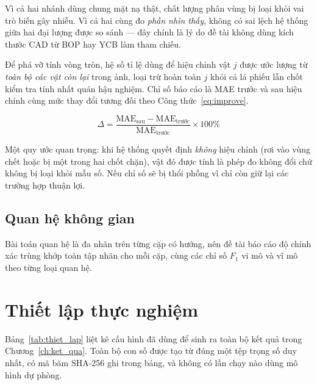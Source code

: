 Vì cả hai nhánh dùng chung mặt nạ thật, chất lượng phân vùng bị loại khỏi vai trò biến gây
nhiễu. Vì cả hai cùng đo \emph{phần nhìn thấy}, không có sai lệch hệ thống giữa hai đại lượng
được so sánh --- đây chính là lý do đề tài không dùng kích thước CAD từ BOP \cite{hodan2018bop}
hay YCB \cite{calli2015ycb} làm tham chiếu.

Để phá vỡ tính vòng tròn, hệ số tỉ lệ dùng để hiệu chỉnh vật $j$ được ước lượng từ \emph{toàn bộ
các vật còn lại} trong ảnh, loại trừ hoàn toàn $j$ khỏi cả lá phiếu lẫn chốt kiểm tra tính nhất
quán hậu nghiệm. Chỉ số báo cáo là MAE trước và sau hiệu chỉnh cùng mức thay đổi tương đối theo
Công thức~\eqref{eq:improve}.

\begin{equation}
\label{eq:improve}
\Delta = \frac{\mathrm{MAE}_{\text{sau}} - \mathrm{MAE}_{\text{trước}}}{\mathrm{MAE}_{\text{trước}}} \times 100\%
\end{equation}

Một quy ước quan trọng: khi hệ thống quyết định \emph{không} hiệu chỉnh (rơi vào vùng chết hoặc
bị một trong hai chốt chặn), vật đó được tính là phép đo không đổi chứ không bị loại khỏi mẫu số.
Nếu chỉ số sẽ bị thổi phồng vì chỉ còn giữ lại các trường hợp thuận lợi.

\subsection{Quan hệ không gian}

Bài toán quan hệ là đa nhãn trên từng cặp có hướng, nên đề tài báo cáo độ chính xác trùng khớp
toàn tập nhãn cho mỗi cặp, cùng các chỉ số $F_1$ vi mô và vĩ mô theo từng loại quan hệ.

\section{Thiết lập thực nghiệm}

Bảng~\ref{tab:thiet_lap} liệt kê cấu hình đã dùng để sinh ra toàn bộ kết quả trong
Chương~\ref{ch:ket_qua}. Toàn bộ con số được tạo từ đúng một tệp trọng số duy nhất, có mã băm
SHA-256 ghi trong bảng, và không có lần chạy nào dùng mô hình dự phòng.

